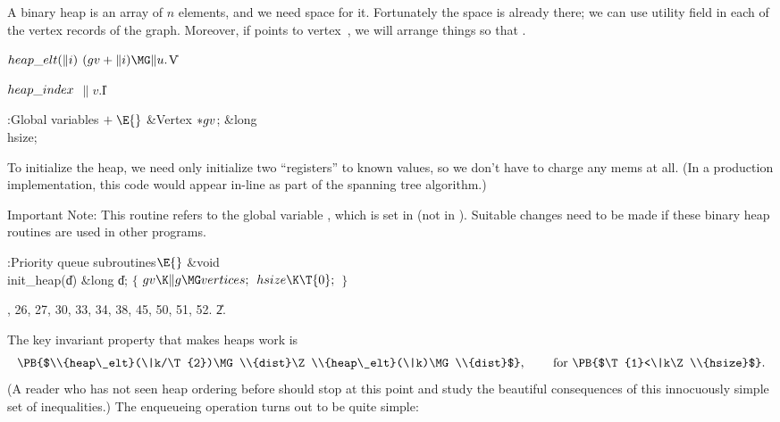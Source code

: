 A binary heap is an array of $n$ elements, and we need space for it.
Fortunately the space is already there; we can use utility field
 in each of the vertex records of the graph. Moreover, if
 points to vertex~, we will arrange things so
that
.

\Y\B\4\D$\\{heap\_elt}(\|i)$ \5
$(\\{gv}+\|i)\MG\|u.{}$\|V\par
\B\4\D$\\{heap\_index}$ \5
$\|v.{}$\|I%
\par
\Y\B\4:Global variables\X${}\mathrel+\E{}$\6
\&{Vertex} ${}{*}\\{gv}{}$;\6
\&{long} \\{hsize};\par
\fi

To initialize the heap, we need only initialize two ``registers'' to
known values, so we don't have to charge any mems at all. (In a production
implementation, this code would appear in-line as part of the
spanning tree algorithm.)

Important Note: This routine refers to the global variable , which is
set in  (not in ). Suitable changes need to be
made
if these binary heap routines are used in other programs.

\Y\B\4:Priority queue subroutines\X${}\E{}$\6
\1\1\&{void} \\{init\_heap}(\|d)\6
\&{long} \|d;\2\2\6
${}\{{}$\1\6
${}\\{gv}\K\|g\MG\\{vertices};{}$\6
${}\\{hsize}\K\T{0};{}$\6
\4${}\}{}$\2\par
{}, 26, 27, 30, 33, 34, 38, 45, 50, 51, 52.
\U2.\fi

The key invariant property that makes heaps work is
$$\hbox{\PB{$\\{heap\_elt}(\|k/\T{2})\MG\\{dist}\Z\\{heap\_elt}(\|k)\MG%
\\{dist}$}, \qquad for \PB{$\T{1}<\|k\Z\\{hsize}$}.}$$
(A reader who has not seen heap ordering before should stop at this
point and study the beautiful consequences of this innocuously simple
set of inequalities.) The enqueueing operation turns out to be quite simple:

